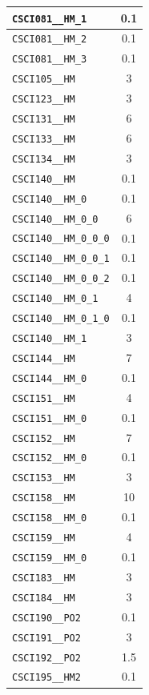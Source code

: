 \begin{longtable}{|p{}|c|}
    \verb|CSCI081__HM_1| & 0.1\\\hline
    \verb|CSCI081__HM_2| & 0.1\\\hline
    \verb|CSCI081__HM_3| & 0.1\\\hline
    \verb|CSCI105__HM| & 3\\\hline
    \verb|CSCI123__HM| & 3\\\hline
    \verb|CSCI131__HM| & 6\\\hline
    \verb|CSCI133__HM| & 6\\\hline
    \verb|CSCI134__HM| & 3\\\hline
    \verb|CSCI140__HM| & 0.1\\\hline
    \verb|CSCI140__HM_0| & 0.1\\\hline
    \verb|CSCI140__HM_0_0| & 6\\\hline
    \verb|CSCI140__HM_0_0_0| & 0.1\\\hline
    \verb|CSCI140__HM_0_0_1| & 0.1\\\hline
    \verb|CSCI140__HM_0_0_2| & 0.1\\\hline
    \verb|CSCI140__HM_0_1| & 4\\\hline
    \verb|CSCI140__HM_0_1_0| & 0.1\\\hline
    \verb|CSCI140__HM_1| & 3\\\hline
    \verb|CSCI144__HM| & 7\\\hline
    \verb|CSCI144__HM_0| & 0.1\\\hline
    \verb|CSCI151__HM| & 4\\\hline
    \verb|CSCI151__HM_0| & 0.1\\\hline
    \verb|CSCI152__HM| & 7\\\hline
    \verb|CSCI152__HM_0| & 0.1\\\hline
    \verb|CSCI153__HM| & 3\\\hline
    \verb|CSCI158__HM| & 10\\\hline
    \verb|CSCI158__HM_0| & 0.1\\\hline
    \verb|CSCI159__HM| & 4\\\hline
    \verb|CSCI159__HM_0| & 0.1\\\hline
    \verb|CSCI183__HM| & 3\\\hline
    \verb|CSCI184__HM| & 3\\\hline
    \verb|CSCI190__PO2| & 0.1\\\hline
    \verb|CSCI191__PO2| & 3\\\hline
    \verb|CSCI192__PO2| & 1.5\\\hline
    \verb|CSCI195__HM2| & 0.1\\\hline

\end{longtable}
